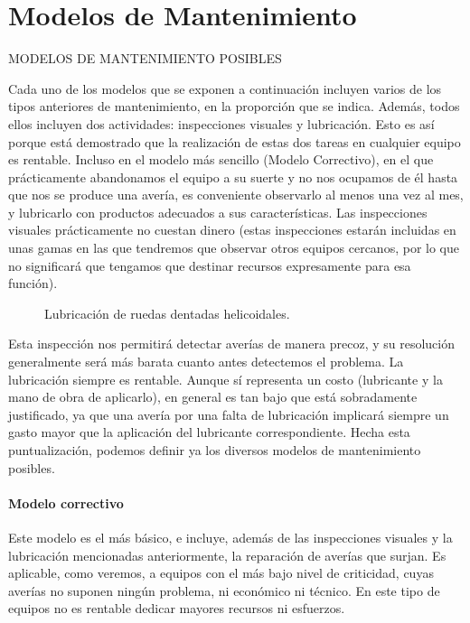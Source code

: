 \documentclass[../main]{subfiles}
\begin{document}
\section{Modelos de Mantenimiento}

MODELOS DE MANTENIMIENTO POSIBLES

Cada uno de los modelos que se exponen a continuación incluyen varios
de los tipos anteriores de mantenimiento, en la proporción que se indica.
Además, todos ellos incluyen dos actividades: inspecciones visuales y lubricación. Esto es así porque está demostrado que la realización de estas dos
tareas en cualquier equipo es rentable. Incluso en el modelo más sencillo
(Modelo Correctivo), en el que prácticamente abandonamos el equipo a su
suerte y no nos ocupamos de él hasta que nos se produce una avería, es conveniente observarlo al menos una vez al mes, y lubricarlo con productos
adecuados a sus características. Las inspecciones visuales prácticamente
no cuestan dinero (estas inspecciones estarán incluidas en unas gamas en las
que tendremos que observar otros equipos cercanos, por lo que no significará que tengamos que destinar recursos expresamente para esa función).
\begin{figure}[h]
    \centering
    \caption{Lubricación de ruedas dentadas helicoidales.}
  
\end{figure}

Esta inspección nos permitirá detectar averías de manera precoz, y su resolución generalmente será más barata cuanto antes detectemos el problema.
La lubricación siempre es rentable. Aunque sí representa un costo (lubricante y la mano de obra de aplicarlo), en general es tan bajo que está sobradamente justificado, ya que una avería por una falta de lubricación implicará siempre un gasto mayor que la aplicación del lubricante
correspondiente.
Hecha esta puntualización, podemos definir ya los diversos modelos de
mantenimiento posibles.

\paragraph{Modelo correctivo}
Este modelo es el más básico, e incluye, además de las inspecciones visuales y la lubricación mencionadas anteriormente, la reparación de averías
que surjan. Es aplicable, como veremos, a equipos con el más bajo nivel de
criticidad, cuyas averías no suponen ningún problema, ni económico ni técnico. En este tipo de equipos no es rentable dedicar mayores recursos ni esfuerzos.
\end{document}
